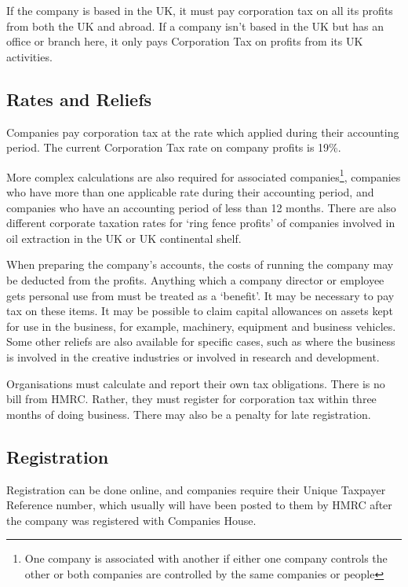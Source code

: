 \documentclass[]{tufte-handout}
\begin{document}
If the company is based in the UK, it must pay corporation tax on all
its profits from both the UK and abroad. If a company isn't based in the
UK but has an office or branch here, it only pays Corporation Tax on
profits from its UK activities.

\hypertarget{rates-and-reliefs}{%
\subsection{Rates and Reliefs}\label{rates-and-reliefs}}

Companies pay corporation tax at the rate which applied during their
accounting period. The current Corporation Tax rate on company profits
is 19\%.

More complex calculations are also required for associated
companies\footnote{One company is associated with another if either one
  company controls the other or both companies are controlled by the
  same companies or people}, companies who have more than one applicable
rate during their accounting period, and companies who have an
accounting period of less than 12 months. There are also different
corporate taxation rates for `ring fence profits' of companies involved
in oil extraction in the UK or UK continental shelf.

When preparing the company's accounts, the costs of running the company
may be deducted from the profits. Anything which a company director or
employee gets personal use from must be treated as a `benefit'. It may
be necessary to pay tax on these items. It may be possible to claim
capital allowances on assets kept for use in the business, for example,
machinery, equipment and business vehicles. Some other reliefs are also
available for specific cases, such as where the business is involved in
the creative industries or involved in research and development.

Organisations must calculate and report their own tax obligations. There
is no bill from HMRC. Rather, they must register for corporation tax
within three months of doing business. There may also be a penalty for
late registration.

\hypertarget{registration}{%
\subsection{Registration}\label{registration}}

Registration can be done online, and companies require their Unique
Taxpayer Reference number, which usually will have been posted to them
by HMRC after the company was registered with Companies House.
\end{document}
